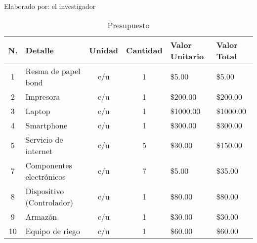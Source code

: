 \begin{ThreePartTable}
	\begin{TableNotes}[flushleft]
		\centering
		\item Elaborado por: el investigador
	\end{TableNotes}
	\begin{longtable}{ |c p{}| c| c |p{} |p{}|}
		\caption{Presupuesto}
		\label{table:presupuesto}                                                                                                                                            \\
		\toprule
		\textbf{N.}                                       & \textbf{Detalle}          & \textbf{Unidad} & \textbf{Cantidad} & \textbf{Valor Unitario} & \textbf{Valor Total} \\
		\midrule
		1                                                 & Resma de papel bond       & c/u             & 1                 & \$5.00                  & \$5.00               \\
		2                                                 & Impresora                 & c/u             & 1                 & \$200.00                & \$200.00             \\
		3                                                 & Laptop                    & c/u             & 1                 & \$1000.00               & \$1000.00            \\
		4                                                 & Smartphone                & c/u             & 1                 & \$300.00                & \$300.00             \\
		5                                                 & Servicio de internet      & c/u             & 5                 & \$30.00                 & \$150.00             \\
		7                                                 & Componentes electrónicos  & c/u             & 7                 & \$5.00                  & \$35.00              \\
		8                                                 & Dispositivo (Controlador) & c/u             & 1                 & \$80.00                 & \$80.00              \\
		9                                                 & Armazón                   & c/u             & 1                 & \$30.00                 & \$30.00              \\
		10                                                & Equipo de riego           & c/u             & 1                 & \$60.00                 & \$60.00              \\

\end{longtable}
\end{ThreePartTable}
